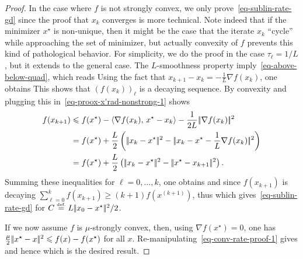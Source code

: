 \begin{proof}
	In the case where $f$ is not strongly convex, we only prove~\eqref{eq-sublin-rate-gd} since the proof that $x_k$ converges is more technical. Note indeed that if the minimizer $x^\star$ is non-unique, then it might be the case that the iterate $x_k$ ``cycle'' while approaching the set of minimizer, but actually convexity of $f$ prevents this kind of pathological behavior. 
	For simplicity, we do the proof in the case $\tau_\ell = 1/L$, but it extends to the general case. 
	The $L$-smoothness property imply~\eqref{eq-above-below-quad}, which reads
	Using the fact that $x_{k+1}-x_k = -\frac{1}{L} \nabla f(x_k)$, one obtains
	This shows that $(f(x_k))_\ell$ is a decaying sequence.
	By convexity
	and plugging this in~\eqref{eq-proox-x'rad-nonstrong-1} shows
	\begin{align}
		f(x_{k+1})  &\leq   
		f(x^\star) - \dotp{\nabla f(x_k)}{x^\star-x_k} - \frac{1}{2L} \norm{\nabla f(x_k)}^2 \\
		&= f(x^\star) + \frac{L}{2}\pa{
			\norm{x_k-x^\star}^2 - \norm{x_k-x^\star-\frac{1}{L}\nabla f(x_k)}^2
		}\\
		&= f(x^\star) + \frac{L}{2}\pa{
			\norm{x_k-x^\star}^2 - \norm{x^\star-x_{k+1}}^2 }. \label{eq-conv-rate-proof-1}
	\end{align}
	Summing these inequalities for $\ell=0,\ldots,k$, one obtains
	and since $f(x_{k+1})$ is decaying $\sum_{\ell=0}^k f(x_{k+1}) \geq (k+1) f(x^{(k+1)})$, thus 
	which gives~\eqref{eq-sublin-rate-gd} for $C \stackrel{\mbox{\upshape\tiny def.}}{=} L |\!| x_0-x^\star |\!|^2/2$.
	
	If we now assume $f$ is $\mu$-strongly convex, then, using $\nabla f(x^\star)=0$, one has $\frac{\mu}{2}|\!| x^\star-x |\!|^2 \leqslant f(x)-f(x^\star)$ for all $x$. 
	Re-manipulating~\eqref{eq-conv-rate-proof-1} gives
	and hence
	which is the desired result. 
\end{proof}

